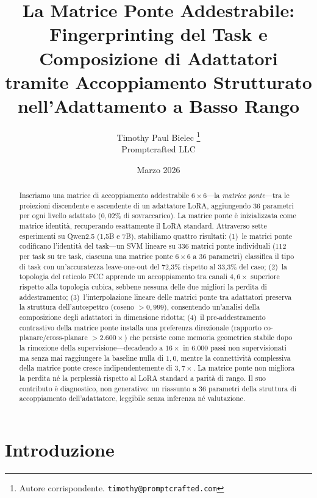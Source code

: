 \documentclass[11pt]{article}
\title{%
  La Matrice Ponte Addestrabile:\\
  Fingerprinting del Task e Composizione di Adattatori\\
  tramite Accoppiamento Strutturato nell'Adattamento a Basso Rango%
}
\author{%
  Timothy Paul Bielec%
  \thanks{Autore corrispondente. \texttt{timothy@promptcrafted.com}}%
  \\
  Promptcrafted LLC%
}
\date{Marzo 2026}
\begin{document}
\maketitle

\begin{abstract}
Inseriamo una matrice di accoppiamento addestrabile $6 \times 6$---la
\emph{matrice ponte}---tra le proiezioni discendente e ascendente di un
adattatore LoRA, aggiungendo 36 parametri per ogni livello adattato
($0{,}02\%$ di sovraccarico). La matrice ponte \`e inizializzata come
matrice identit\`a, recuperando esattamente il LoRA standard. Attraverso
sette esperimenti su Qwen2.5 (1,5B e 7B), stabiliamo quattro risultati:
(1)~le matrici ponte codificano l'identit\`a del task---un SVM lineare
su 336 matrici ponte individuali (112 per task su tre task, ciascuna
una matrice ponte $6 \times 6$ a 36 parametri) classifica il tipo di
task con un'accuratezza leave-one-out del 72,3\% rispetto al 33,3\%
del caso;
(2)~la topologia del reticolo FCC apprende un accoppiamento tra canali
$4{,}6\times$ superiore rispetto alla topologia cubica, sebbene nessuna
delle due migliori la perdita di addestramento; (3)~l'interpolazione
lineare delle matrici ponte tra adattatori preserva la struttura
dell'autospettro (coseno $> 0{,}999$), consentendo un'analisi della
composizione degli adattatori in dimensione ridotta; (4)~il
pre-addestramento contrastivo della matrice ponte installa una
preferenza direzionale (rapporto co-planare/cross-planare $> 2.600\times$)
che persiste come memoria geometrica stabile dopo la rimozione della
supervisione---decadendo a $16\times$ in 6.000 passi non supervisionati
ma senza mai raggiungere la baseline nulla di $1{,}0$, mentre la
connettivit\`a complessiva della matrice ponte cresce indipendentemente
di $3{,}7\times$. La matrice ponte non migliora la perdita n\'e la
perplessi\`a rispetto al LoRA standard a parit\`a di rango. Il suo
contributo \`e diagnostico, non generativo: un riassunto a 36 parametri
della struttura di accoppiamento dell'adattatore, leggibile senza
inferenza n\'e valutazione.
\end{abstract}


\section{Introduzione}
\label{sec:introduction}
\end{document}
